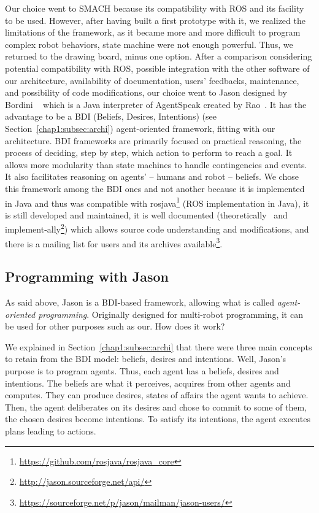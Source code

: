 \documentclass[a4paper,11pt,twoside]{StyleThese}
\begin{document}
Our choice went to SMACH because its compatibility with ROS and its facility to be used. However, after having built a first prototype with it, we realized the limitations of the framework, as it became more and more difficult to program complex robot behaviors, state machine were not enough powerful. Thus, we returned to the drawing board, minus one option. After a comparison considering potential compatibility with ROS, possible integration with the other software of our architecture, availability of documentation, users' feedbacks, maintenance, and possibility of code modifications, our choice went to Jason designed by Bordini \etal~\cite{bordini_2007_jason} which is a Java interpreter of AgentSpeak created by Rao~\cite{rao_1996_agentspeak}. It has the advantage to be a BDI (Beliefs, Desires, Intentions) (see Section~\ref{chap1:subsec:archi}) agent-oriented framework, fitting with our architecture. BDI frameworks are primarily focused on practical reasoning, \ie the process of deciding, step by step, which action to perform to reach a goal. It allows more modularity than state machines to handle contingencies and events. It also facilitates reasoning on agents' -- humans and robot -- beliefs. We chose this framework among the BDI ones and not another because it is implemented in Java and thus was compatible with rosjava\footnote{\url{https://github.com/rosjava/rosjava_core}} (\ie ROS implementation in Java), it is still developed and maintained, it is well documented (theoretically~\cite{bordini_2007_jason} and implement-ally\footnote{\url{http://jason.sourceforge.net/api/}}) which allows source code understanding and modifications, and there is a mailing list for users and its archives available\footnote{\url{https://sourceforge.net/p/jason/mailman/jason-users/}}.

\subsection{Programming with Jason}\label{chap2:subsec:jason}
As said above, Jason is a BDI-based framework, allowing what is called \textit{agent-oriented programming}. Originally designed for multi-robot programming, it can be used for other purposes such as our. How does it work?

We explained in Section~\ref{chap1:subsec:archi} that there were three main concepts to retain from the BDI model: beliefs, desires and intentions. Well, Jason's purpose is to program agents. Thus, each agent has a beliefs, desires and intentions. The beliefs are what it perceives, acquires from other agents and computes. They can produce desires, \ie states of affairs the agent wants to achieve. Then, the agent deliberates on its desires and chose to commit to some of them, \ie the chosen desires become intentions. To satisfy its intentions, the agent executes plans leading to actions. 
\end{document}
